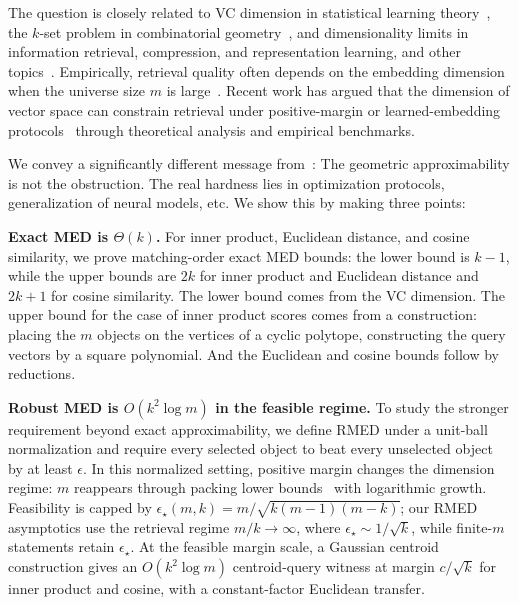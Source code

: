 \documentclass{article}
\begin{document}
The question is closely related to VC dimension in statistical learning theory~\citep{mohri2018foundations}, the $k$-set problem in combinatorial geometry~\citep{matousek2013lectures}, and dimensionality limits in information retrieval, compression, and representation learning, and other topics~\citep{alon1985geometrical,lee2019latent,weller2025mfollowir,andoni2008near,izacard2021unsupervised,wang2022text}. Empirically, retrieval quality often depends on the embedding dimension when the universe size $m$ is large~\citep{yin2018dimensionality,reimers2021curse}. Recent work has argued that the dimension of vector space can constrain retrieval under positive-margin or learned-embedding protocols~\citep{weller2025theoretical} through theoretical analysis and empirical benchmarks.

We convey a significantly different message from~\citep{weller2025theoretical}: The geometric approximability is not the obstruction. The real hardness lies in optimization protocols, generalization of neural models, etc. We show this by making three points:

\noindent\textbf{Exact MED is $\Theta(k)$.}
For inner product, Euclidean distance, and cosine similarity, we prove matching-order exact MED bounds: the lower bound is $k-1$, while the upper bounds are $2k$ for inner product and Euclidean distance and $2k+1$ for cosine similarity. The lower bound comes from the VC dimension. The upper bound for the case of inner product scores comes from a construction: placing the $m$ objects on the vertices of a cyclic polytope, constructing the query vectors by a square polynomial. And the Euclidean and cosine bounds follow by reductions.

\noindent\textbf{Robust MED is $O(k^2\log m)$ in the feasible regime.}
To study the stronger requirement beyond exact approximability, we define RMED under a unit-ball normalization and require every selected object to beat every unselected object by at least $\epsilon$. In this normalized setting, positive margin changes the dimension regime: $m$ reappears through packing lower bounds~\citep{weller2025theoretical} with logarithmic growth. Feasibility is capped by $\epsilon_\star(m,k)=m/\sqrt{k(m-1)(m-k)}$; our RMED asymptotics use the retrieval regime $m/k\to\infty$, where $\epsilon_\star\sim1/\sqrt{k}$, while finite-$m$ statements retain $\epsilon_\star$. At the feasible margin scale, a Gaussian centroid construction gives an $O(k^2\log m)$ centroid-query witness at margin $c/\sqrt{k}$ for inner product and cosine, with a constant-factor Euclidean transfer.
\end{document}
